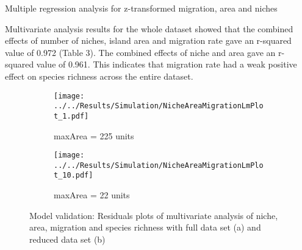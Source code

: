 \documentclass{article}
\begin{document}
\begin{table}[h!]
\centering
\caption{Multiple regression analysis for z-transformed migration, area and niches}
   \end{table}\bigskip
   
Multivariate analysis results for the whole dataset showed that the combined effects of number of niches, island area and migration rate gave an r-squared value of 0.972 (Table 3). The combined effects of niche and area gave an r-squared value of 0.961. This indicates that migration rate had a weak positive effect on species richness across the entire dataset.  \bigskip

\begin{figure}[h!]
  \centering
  \begin{subfigure}[b]{0.4\linewidth}
    \texttt{[image: ../../Results/Simulation/NicheAreaMigrationLmPlot\_1.pdf]}
    \caption{maxArea = 225 units}
  \end{subfigure}
  \begin{subfigure}[b]{0.4\linewidth}
    \texttt{[image: ../../Results/Simulation/NicheAreaMigrationLmPlot\_10.pdf]}
    \caption{maxArea = 22 units}
  \end{subfigure}
  \caption{Model validation: Residuals plots of multivariate analysis of niche, area, migration and species richness with full data set (a) and reduced data set (b)}
  \label{fig:Model validation multivariate 1}
\end{figure}
\end{document}
